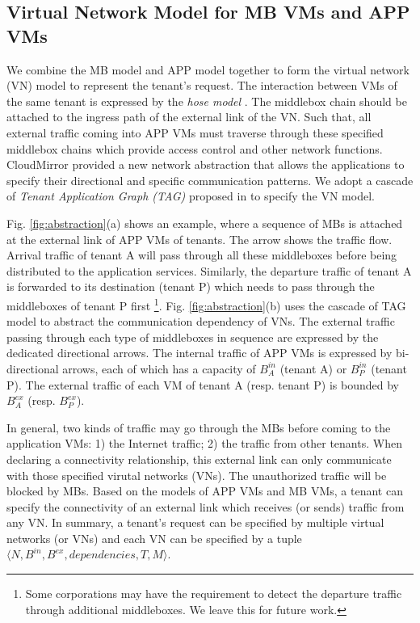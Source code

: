 \documentclass[review]{elsarticle}
\begin{document}
\subsection{Virtual Network Model for MB VMs and APP VMs} 
We combine the MB model and APP model together to form the virtual network (VN) model to represent the tenant's request. The interaction between VMs of the same tenant is expressed by the \emph{hose model} \cite{hose_model}. The middlebox chain should be attached to the ingress path of the external link of the VN. Such that, all external traffic coming into APP VMs must traverse through these specified middlebox chains which provide access control and other network functions. CloudMirror \cite{cloudmirror} provided a new network abstraction that allows the applications to specify their directional and specific communication patterns. We adopt a cascade of \emph{Tenant Application Graph (TAG)} proposed in \cite{cloudmirror} to specify the VN model. 


Fig. \ref{fig:abstraction}(a) shows an example, where a sequence of MBs is attached at the external link of APP VMs of tenants. The arrow shows the traffic flow. Arrival traffic of tenant A will pass through all these middleboxes before being distributed to the application services. Similarly,  the departure traffic of tenant A is forwarded to its destination (tenant P) which needs to pass through the middleboxes of tenant P first \footnote{Some corporations may have the requirement to detect the departure traffic through additional middleboxes. We leave this for future work. }.  Fig. \ref{fig:abstraction}(b) uses the cascade of TAG model to abstract the communication dependency of VNs. The external traffic passing through each type of middleboxes in sequence are expressed by the dedicated directional arrows. The internal traffic of APP VMs is expressed by bi-directional arrows, each of which has a capacity of $B_{A}^{in}$ (tenant A) or $B_{P}^{in}$ (tenant P). The external traffic of each VM of tenant A (resp. tenant P) is bounded by $B_{A}^{ex}$ (resp. $B_{P}^{ex}$). 


In general, two kinds of traffic may go through the MBs before coming to the application VMs: 1) the Internet traffic; 2) the traffic from other tenants. When declaring a connectivity relationship, this external link can only communicate with those specified virutal networks (VNs). The unauthorized traffic will be blocked by MBs. Based on the models of APP VMs and MB VMs, a tenant can specify the connectivity of an external link which receives (or sends) traffic from any VN. In summary, a tenant's request can be specified by multiple virtual networks (or VNs) and each VN can be specified by a tuple $\langle N, B^{in}, B^{ex}, dependencies, T, M\rangle$. 
\end{document}
